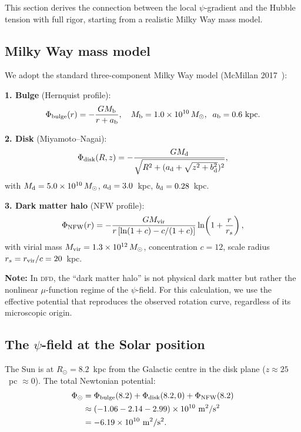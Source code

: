 \documentclass[aps,prl,twocolumn,superscriptaddress,showpacs]{revtex4-2}
\newcommand{\DFD}{\textsc{dfd}}
\newcommand{\Msun}{M_\odot}
\begin{document}
This section derives the connection between the local $\psi$-gradient
and the Hubble tension with full rigor, starting from a realistic
Milky Way mass model.

\subsection{Milky Way mass model}

We adopt the standard three-component Milky Way model
(McMillan 2017~\cite{McMillan2017}):

\textbf{1. Bulge} (Hernquist profile):
\begin{equation}
\Phi_{\rm bulge}(r) = -\frac{GM_{\rm b}}{r + a_{\rm b}},
\quad M_{\rm b} = 1.0\times 10^{10}\,\Msun,\;\; a_{\rm b} = 0.6~\text{kpc}.
\end{equation}

\textbf{2. Disk} (Miyamoto--Nagai):
\begin{equation}
\Phi_{\rm disk}(R,z) = -\frac{GM_{\rm d}}
{\sqrt{R^2 + (a_{\rm d} + \sqrt{z^2 + b_{\rm d}^2})^2}},
\end{equation}
with $M_{\rm d} = 5.0\times 10^{10}\,\Msun$,
$a_{\rm d} = 3.0$~kpc, $b_{\rm d} = 0.28$~kpc.

\textbf{3. Dark matter halo} (NFW profile):
\begin{equation}
\Phi_{\rm NFW}(r) = -\frac{GM_{\rm vir}}{r\,[\ln(1+c)-c/(1+c)]}
\ln\!\left(1 + \frac{r}{r_s}\right),
\end{equation}
with virial mass $M_{\rm vir} = 1.3\times 10^{12}\,\Msun$,
concentration $c = 12$, scale radius $r_s = r_{\rm vir}/c = 20$~kpc.

\textbf{Note:} In \DFD, the ``dark matter halo'' is not physical
dark matter but rather the nonlinear $\mu$-function regime of the
$\psi$-field.  For this calculation, we use the effective potential
that reproduces the observed rotation curve, regardless of its
microscopic origin.

\subsection{The $\psi$-field at the Solar position}

The Sun is at $R_\odot = 8.2$~kpc from the Galactic centre in
the disk plane ($z \approx 25$~pc $\approx 0$).  The total
Newtonian potential:
\begin{align}
\Phi_\odot &= \Phi_{\rm bulge}(8.2) + \Phi_{\rm disk}(8.2,0)
+ \Phi_{\rm NFW}(8.2) \nonumber\\
&\approx (-1.06 - 2.14 - 2.99)\times 10^{10}~\text{m}^2/\text{s}^2
\nonumber\\
&= -6.19\times 10^{10}~\text{m}^2/\text{s}^2.
\end{align}
\end{document}

